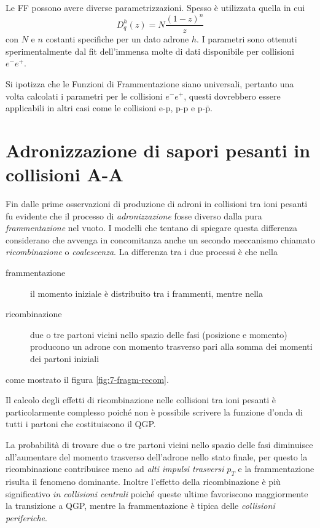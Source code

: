         Le FF possono avere diverse parametrizzazioni. Spesso è utilizzata quella in cui
        \begin{equation*}
            D_{q}^{h}(z) = N \frac{(1-z)^n}{z}
        \end{equation*}
        con $N$ e $n$ costanti specifiche per un dato adrone $h$. I parametri sono ottenuti sperimentalmente dal fit dell'immensa molte di dati disponibile per collisioni $e^{-} e^{+}$.

        Si ipotizza che le Funzioni di Frammentazione siano universali, pertanto una volta calcolati i parametri per le collisioni $e^{-} e^{+}$, questi dovrebbero essere applicabili in altri casi come le collisioni e-p, p-p e p-$\mathrm{\bar{p}}$.

\section{Adronizzazione di sapori pesanti in collisioni A-A}
    Fin dalle prime osservazioni di produzione di adroni in collisioni tra ioni pesanti fu evidente che il processo di \textit{adronizzazione} fosse diverso dalla pura \textit{frammentazione} nel vuoto. I modelli che tentano di spiegare questa differenza considerano che avvenga in concomitanza anche un secondo meccanismo chiamato \textit{ricombinazione} o \textit{coalescenza}. La differenza tra i due processi è che nella
    \begin{description}
        \item[frammentazione] il momento iniziale è distribuito tra i frammenti, mentre nella

        \item[ricombinazione] due o tre partoni vicini nello spazio delle fasi (posizione e momento) producono un adrone con momento trasverso pari alla somma dei momenti dei partoni iniziali
    \end{description}
    come mostrato il figura \ref{fig:7-fragm-recom}.

    Il calcolo degli effetti di ricombinazione nelle collisioni tra ioni pesanti è particolarmente complesso poiché non è possibile scrivere la funzione d'onda di tutti i partoni che costituiscono il QGP.

    La probabilità di trovare due o tre partoni vicini nello spazio delle fasi diminuisce all'aumentare del momento trasverso dell'adrone nello stato finale, per questo la ricombinazione contribuisce meno ad \textit{alti impulsi trasversi} $p_T$ e la frammentazione risulta il fenomeno dominante. Inoltre l'effetto della ricombinazione è più significativo \textit{in collisioni centrali} poiché queste ultime favoriscono maggiormente la transizione a QGP, mentre la frammentazione è tipica delle \textit{collisioni periferiche}.

